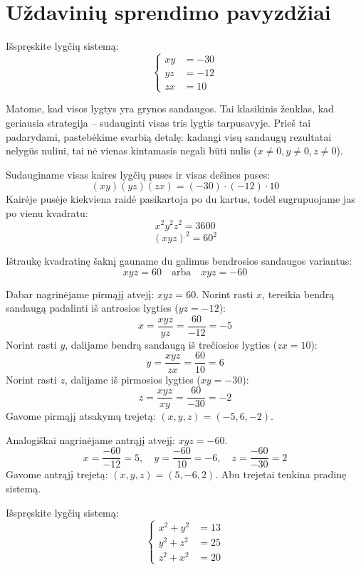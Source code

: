 \documentclass[11pt,a4paper]{scrartcl}
\begin{document}
\section{Uždavinių sprendimo pavyzdžiai}

\begin{example}
Išspręskite lygčių sistemą:
\[
\left\{\begin{aligned}
    xy &= -30 \\
    yz &= -12 \\
    zx &= 10
\end{aligned}\right.
\]
\end{example}

\begin{solution}
Matome, kad visos lygtys yra grynos sandaugos. Tai klasikinis ženklas, kad geriausia strategija – sudauginti visas tris lygtis tarpusavyje. Prieš tai padarydami, pastebėkime svarbią detalę: kadangi visų sandaugų rezultatai nelygūs nuliui, tai nė vienas kintamasis negali būti nulis ($x \neq 0, y \neq 0, z \neq 0$).

Sudauginame visas kaires lygčių puses ir visas dešines puses:
$$ (xy)(yz)(zx) = (-30) \cdot (-12) \cdot 10 $$
Kairėje pusėje kiekviena raidė pasikartoja po du kartus, todėl sugrupuojame jas po vienu kvadratu:
$$ x^2 y^2 z^2 = 3600 $$
$$ (xyz)^2 = 60^2 $$

Ištraukę kvadratinę šaknį gauname du galimus bendrosios sandaugos variantus:
$$ xyz = 60 \quad \text{arba} \quad xyz = -60 $$

Dabar nagrinėjame pirmąjį atvejį: $xyz = 60$.
Norint rasti $x$, tereikia bendrą sandaugą padalinti iš antrosios lygties ($yz = -12$):
$$ x = \frac{xyz}{yz} = \frac{60}{-12} = -5 $$
Norint rasti $y$, dalijame bendrą sandaugą iš trečiosios lygties ($zx = 10$):
$$ y = \frac{xyz}{zx} = \frac{60}{10} = 6 $$
Norint rasti $z$, dalijame iš pirmosios lygties ($xy = -30$):
$$ z = \frac{xyz}{xy} = \frac{60}{-30} = -2 $$
Gavome pirmąjį atsakymų trejetą: $(x,y,z) = (-5, 6, -2)$.

Analogiškai nagrinėjame antrąjį atvejį: $xyz = -60$.
$$ x = \frac{-60}{-12} = 5, \quad y = \frac{-60}{10} = -6, \quad z = \frac{-60}{-30} = 2 $$
Gavome antrąjį trejetą: $(x,y,z) = (5, -6, 2)$. Abu trejetai tenkina pradinę sistemą.
\end{solution}


\begin{example}
Išspręskite lygčių sistemą:
\[
\left\{\begin{aligned}
    x^2 + y^2 &= 13 \\
    y^2 + z^2 &= 25 \\
    z^2 + x^2 &= 20
\end{aligned}\right.
\]
\end{example}
\end{document}

